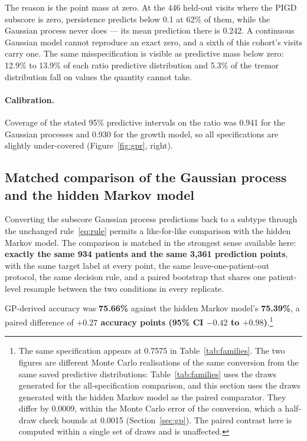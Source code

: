 \documentclass[11pt]{article}
\begin{document}
The reason is the point mass at zero. At the 446 held-out visits where the PIGD
subscore is zero, persistence predicts below 0.1 at 62\% of them, while the
Gaussian process never does --- its mean prediction there is 0.242. A continuous
Gaussian model cannot reproduce an exact zero, and a sixth of this cohort's
visits carry one. The same misspecification is visible as predictive mass below
zero: 12.9\% to 13.9\% of each ratio predictive distribution and 5.3\% of the
tremor distribution fall on values the quantity cannot take.

\paragraph{Calibration.}
Coverage of the stated 95\% predictive intervals on the ratio was 0.941 for the
Gaussian processes and 0.930 for the growth model, so all specifications are
slightly under-covered (Figure~\ref{fig:gpr}, right).

\subsection{Matched comparison of the Gaussian process and the hidden Markov model}
\label{sec:matched}

Converting the subscore Gaussian process predictions back to a subtype through
the unchanged rule~\eqref{eq:rule} permits a like-for-like comparison with the
hidden Markov model. The comparison is matched in the strongest sense available
here: \textbf{exactly the same 934 patients and the same 3,361 prediction
points}, with the same target label at every point, the same leave-one-patient-out
protocol, the same decision rule, and a paired bootstrap that shares one
patient-level resample between the two conditions in every replicate.

GP-derived accuracy was \textbf{75.66\%} against the hidden Markov model's
\textbf{75.39\%}, a paired difference of \textbf{$+0.27$ accuracy points (95\%
CI $-0.42$ to $+0.98$)}.\footnote{The same specification appears at 0.7575 in
Table~\ref{tab:families}. The two figures are different Monte Carlo
realisations of the same conversion from the same saved predictive
distributions: Table~\ref{tab:families} uses the draws generated for the
all-specification comparison, and this section uses the draws generated with the
hidden Markov model as the paired comparator. They differ by 0.0009, within the
Monte Carlo error of the conversion, which a half-draw check bounds at 0.0015
(Section~\ref{sec:gp}). The paired contrast here is computed within a single set
of draws and is unaffected.}
\end{document}

